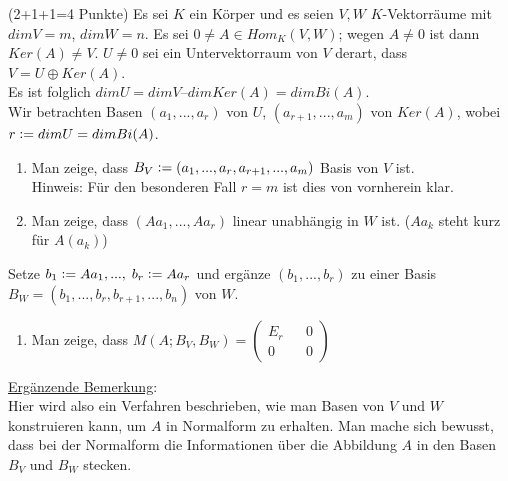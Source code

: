 \documentclass{uebblatt}
\begin{document}
\begin{aufgabe}{ (2+1+1=4 Punkte)}
Es sei $K$ ein Körper und es seien $V, W$ $K$-Vektorräume mit $dimV = m$, $dimW = n$. Es sei $0 \neq A \in Hom_K(V,W)$; wegen $A \neq 0$ ist dann $Ker(A) \neq V$. $U \neq 0$ sei ein Untervektorraum von $V$ derart, dass $V = U \oplus Ker(A)$.\\
Es ist folglich $dimU = dimV – dimKer(A) = dimBi(A)$.\\
Wir betrachten Basen $(a_1, ..., a_r)$ von $U$, $(a_{r+1}, ..., a_m)$ von $Ker(A)$, wobei\break
$r \vcentcolon= dimU = dimBi(A)$.
\begin{enumerate}
\item Man zeige, dass $B_V \vcentcolon= (a_1, ..., a_r, a_{r+1}, ..., a_m)$ Basis von $V$ ist.\\
Hinweis: Für den besonderen Fall $r = m$ ist dies von vornherein klar.
\item Man zeige, dass $(Aa_1, ..., Aa_r)$ linear unabhängig in $W$ ist. ($Aa_k$ steht kurz für $A(a_k)$)
\end{enumerate}
Setze $b_1 \vcentcolon= Aa_1, ..., \; b_r \vcentcolon= Aa_r$ und ergänze $(b_1, ..., b_r)$ zu einer Basis $B_W = (b_1, ..., b_r, b_{r+1}, ..., b_n)$ von $W$.
\begin{enumerate}[resume]
\item Man zeige, dass $M(A; B_V, B_W) = \begin{pmatrix} E_r && 0 \\ 0 && 0 \end{pmatrix}$
\end{enumerate}
\underline{Ergänzende Bemerkung}:\\
Hier wird also ein Verfahren beschrieben, wie man Basen von $V$ und $W$ konstruieren kann, um $A$ in Normalform zu erhalten. Man mache sich bewusst, dass bei der Normalform die Informationen über die Abbildung $A$ in den Basen $B_V$ und $B_W$ stecken. 
\end{aufgabe}
\end{document}
